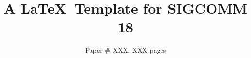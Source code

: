\documentclass[sigconf]{acmart}
\begin{document}
\title{A \LaTeX\ Template for SIGCOMM 18}

\author{Paper \# XXX, XXX pages}

\renewcommand{\shortauthors}{X.et al.}

\begin{abstract}
    \blindtext
\end{abstract}

\maketitle





\end{document}
